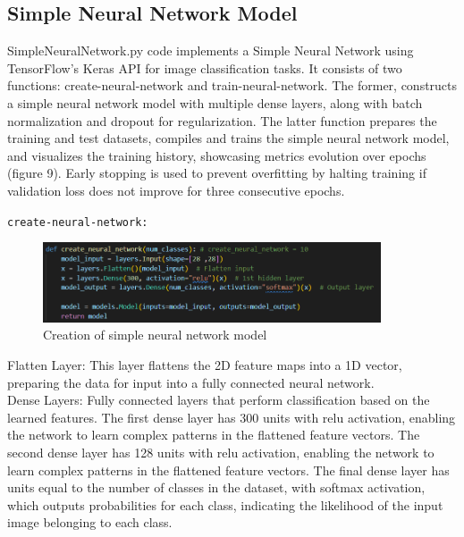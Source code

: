\documentclass{article}
\newcommand{\code}[1]{\colorbox{light-gray}{\texttt{#1}}}
\begin{document}
\newpage
\subsection{Simple Neural Network Model}
SimpleNeuralNetwork.py code implements a Simple Neural Network using TensorFlow's Keras API for image classification tasks.
It consists of two functions: create-neural-network and train-neural-network.
The former, constructs a simple neural network model with multiple dense layers, along with batch normalization and dropout for regularization. The latter function prepares the training and test datasets, compiles and trains the simple neural network model, and visualizes the training history, showcasing metrics evolution over epochs (figure 9). Early stopping is used to prevent overfitting by halting training if validation loss does not improve for three consecutive epochs.\\\newline

\code{create-neural-network:}\\\newline
\begin{figure}[H]
    \caption{Creation of simple neural network model}
    \centering
    \includegraphics[width=10cm]{../imgFolder/create-neural-network-code.png}
\end{figure}

Flatten Layer: This layer flattens the 2D feature maps into a 1D vector,
preparing the data for input into a fully connected neural network.\\\newline
Dense Layers: Fully connected layers that perform classification based on the learned features.
The first dense layer has 300 units with relu activation, enabling the network to learn complex
patterns in the flattened feature vectors.
The second dense layer has 128 units with relu activation, enabling the network to learn complex
patterns in the flattened feature vectors.
The final dense layer has units equal to the number of classes
in the dataset, with softmax activation, which outputs probabilities for each class,
indicating the likelihood of the input image belonging to each class.\\\newline
\end{document}
